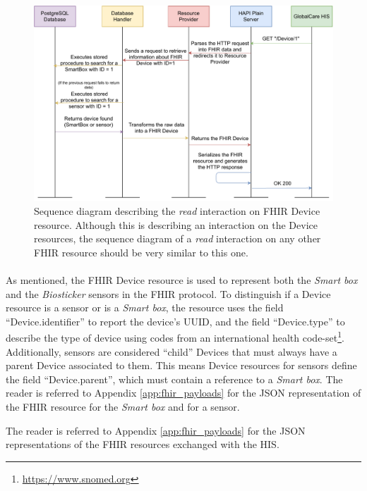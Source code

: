 \begin{figure}[H]
    \centering
    \includegraphics[width=\linewidth]{images/fhir get device.pdf}
    \caption[Sequence diagram describing the \textit{read} interaction on \acs{FHIR} Device resource.]{Sequence diagram describing the \textit{read} interaction on \acs{FHIR} Device resource. Although this is describing an interaction on the Device resources, the sequence diagram of a \textit{read} interaction on any other \acs{FHIR} resource should be very similar to this one.}
    \label{fig:fhir-get-device}
\end{figure} 

\paragraph{} As mentioned, the \acs{FHIR} Device resource is used to represent both the \textit{Smart box} and the \textit{Biosticker} sensors in the \acs{FHIR} protocol. To distinguish if a Device resource is a sensor or is a \textit{Smart box}, the resource uses the field ``Device.identifier'' to report the device's \acs{UUID}, and the field ``Device.type'' to describe the type of device using codes from an international health code-set\footnote{\url{https://www.snomed.org}}. Additionally, sensors are considered ``child'' Devices that must always have a parent Device associated to them. This means Device resources for sensors define the field ``Device.parent'', which must contain a reference to a \textit{Smart box}. The reader is referred to Appendix \ref{app:fhir_payloads} for the \acs{JSON} representation of the \acs{FHIR} resource for the \textit{Smart box} and for a sensor.

The reader is referred to Appendix \ref{app:fhir_payloads} for the \acs{JSON} representations of the \acs{FHIR} resources exchanged with the \acs{HIS}.

